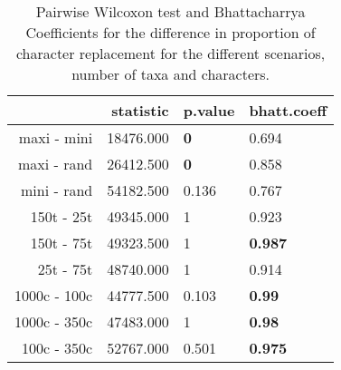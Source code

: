 \begin{table}[ht]
\centering
\begin{tabular}{rrll}
  \hline
 & statistic & p.value & bhatt.coeff \\ 
  \hline
maxi - mini & 18476.000 & \textbf{0} & 0.694 \\ 
  maxi - rand & 26412.500 & \textbf{0} & 0.858 \\ 
  mini - rand & 54182.500 & 0.136 & 0.767 \\ 
  150t - 25t & 49345.000 & 1 & 0.923 \\ 
  150t - 75t & 49323.500 & 1 & \textbf{0.987} \\ 
  25t - 75t & 48740.000 & 1 & 0.914 \\ 
  1000c - 100c & 44777.500 & 0.103 & \textbf{0.99} \\ 
  1000c - 350c & 47483.000 & 1 & \textbf{0.98} \\ 
  100c - 350c & 52767.000 & 0.501 & \textbf{0.975} \\ 
   \hline
\end{tabular}
\caption{Pairwise Wilcoxon test and Bhattacharrya Coefficients for the difference in proportion of character replacement for the different scenarios, number of taxa and characters.} 
\label{Tab_proportion_replacement}
\end{table}
